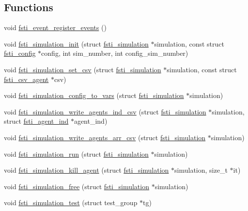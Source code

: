 \subsection*{Functions}
\begin{DoxyCompactItemize}
\item 
void \mbox{\hyperlink{fsti-simulation_8c_a0922fc7e9d2a95b59e3f1df672f3bdc4}{fsti\+\_\+event\+\_\+register\+\_\+events}} ()
\item 
void \mbox{\hyperlink{fsti-simulation_8c_a5e7080c9230e123dc212cc19bb209487}{fsti\+\_\+simulation\+\_\+init}} (struct \mbox{\hyperlink{structfsti__simulation}{fsti\+\_\+simulation}} $\ast$simulation, const struct \mbox{\hyperlink{structfsti__config}{fsti\+\_\+config}} $\ast$config, int sim\+\_\+number, int config\+\_\+sim\+\_\+number)
\item 
void \mbox{\hyperlink{fsti-simulation_8c_acfe68dac880c7a6112ac0d13bfc34cce}{fsti\+\_\+simulation\+\_\+set\+\_\+csv}} (struct \mbox{\hyperlink{structfsti__simulation}{fsti\+\_\+simulation}} $\ast$simulation, const struct \mbox{\hyperlink{structfsti__csv__agent}{fsti\+\_\+csv\+\_\+agent}} $\ast$csv)
\item 
void \mbox{\hyperlink{fsti-simulation_8c_a8fd28c7a573e98f3785b5f3b7b6b08e7}{fsti\+\_\+simulation\+\_\+config\+\_\+to\+\_\+vars}} (struct \mbox{\hyperlink{structfsti__simulation}{fsti\+\_\+simulation}} $\ast$simulation)
\item 
void \mbox{\hyperlink{fsti-simulation_8c_adac2d348ab392af024a2cbeabfb0c739}{fsti\+\_\+simulation\+\_\+write\+\_\+agents\+\_\+ind\+\_\+csv}} (struct \mbox{\hyperlink{structfsti__simulation}{fsti\+\_\+simulation}} $\ast$simulation, struct \mbox{\hyperlink{structfsti__agent__ind}{fsti\+\_\+agent\+\_\+ind}} $\ast$agent\+\_\+ind)
\item 
void \mbox{\hyperlink{fsti-simulation_8c_acf97be6cf8883189d51292eceea0c43e}{fsti\+\_\+simulation\+\_\+write\+\_\+agents\+\_\+arr\+\_\+csv}} (struct \mbox{\hyperlink{structfsti__simulation}{fsti\+\_\+simulation}} $\ast$simulation)
\item 
void \mbox{\hyperlink{fsti-simulation_8c_ab512e1f50ac5ac9bdde81f48d73137b6}{fsti\+\_\+simulation\+\_\+run}} (struct \mbox{\hyperlink{structfsti__simulation}{fsti\+\_\+simulation}} $\ast$simulation)
\item 
void \mbox{\hyperlink{fsti-simulation_8c_a9d76145c517a59cb16affaf38f6da235}{fsti\+\_\+simulation\+\_\+kill\+\_\+agent}} (struct \mbox{\hyperlink{structfsti__simulation}{fsti\+\_\+simulation}} $\ast$simulation, size\+\_\+t $\ast$it)
\item 
void \mbox{\hyperlink{fsti-simulation_8c_ae29f6c96793ab175ff8021f853c0b898}{fsti\+\_\+simulation\+\_\+free}} (struct \mbox{\hyperlink{structfsti__simulation}{fsti\+\_\+simulation}} $\ast$simulation)
\item 
void \mbox{\hyperlink{fsti-simulation_8c_a86e77278da10e20688210e211787e7d2}{fsti\+\_\+simulation\+\_\+test}} (struct test\+\_\+group $\ast$tg)
\end{DoxyCompactItemize}


